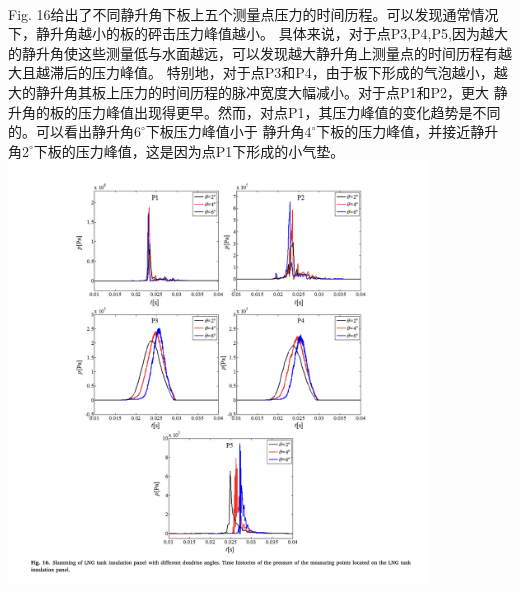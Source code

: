 \documentclass[UTF8]{ctexart}
\begin{document}
\paragraph{\quad}Fig. 16给出了不同静升角下板上五个测量点压力的时间历程。可以发现通常情况下，静升角越小的板的砰击压力峰值越小。
                具体来说，对于点P3,P4,P5,因为越大的静升角使这些测量低与水面越远，可以发现越大静升角上测量点的时间历程有越大且越滞后的压力峰值。
                特别地，对于点P3和P4，由于板下形成的气泡越小，越大的静升角其板上压力的时间历程的脉冲宽度大幅减小。对于点P1和P2，更大
                静升角的板的压力峰值出现得更早。然而，对点P1，其压力峰值的变化趋势是不同的。可以看出静升角$6^\circ$下板压力峰值小于
                静升角$4^\circ$下板的压力峰值，并接近静升角$2^\circ$下板的压力峰值，这是因为点P1下形成的小气垫。\\
{
    \centering
    \includegraphics[width=30em]{./source/Fig16.png}
}
\end{document}
